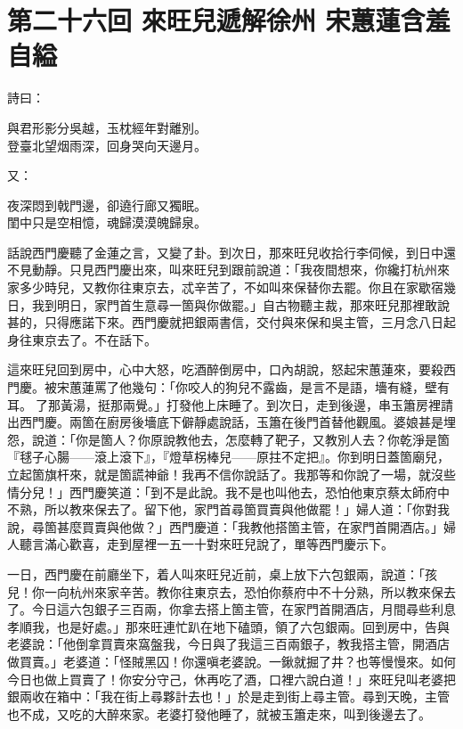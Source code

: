 
\chapter*{第二十六回 來旺兒遞解徐州 宋蕙蓮含羞自縊}


詩曰：

\begin{myquote}
與君形影分吳越，玉枕經年對離別。\\登臺北望烟雨深，回身哭向天邊月。
\end{myquote}

又：

\begin{myquote}
夜深悶到戟門邊，卻遶行廊又獨眠。\\閨中只是空相憶，魂歸漠漠魄歸泉。
\end{myquote}

話說西門慶聽了金蓮之言，又變了卦。到次日，那來旺兒收拾行李伺候，到日中還不見動靜。只見西門慶出來，叫來旺兒到跟前說道：「我夜間想來，你纔打杭州來家多少時兒，又教你往東京去，忒辛苦了，不如叫來保替你去罷。你且在家歇宿幾日，我到明日，家門首生意尋一箇與你做罷。」自古物聽主裁，那來旺兒那裡敢說甚的，只得應諾下來。西門慶就把銀兩書信，交付與來保和吳主管，三月念八日起身往東京去了。不在話下。

這來旺兒回到房中，心中大怒，{}吃酒醉倒房中，口內胡說，怒起宋蕙蓮來，要殺西門慶。{}被宋蕙蓮罵了他幾句：「你咬人的狗兒不露齒，是言不是語，墻有縫，壁有耳。𠳹了那黃湯，挺那兩覺。」打發他上床睡了。到次日，走到後邊，串玉簫房裡請出西門慶。兩箇在廚房後墻底下僻靜處說話，玉簫在後門首替他觀風。婆娘甚是埋怨，說道：「你是箇人？你原說教他去，怎麼轉了靶子，又教別人去？你乾淨是箇『毬子心腸——滾上滾下』，{}『燈草柺棒兒——原拄不定把』。你到明日蓋箇廟兒，立起箇旗杆來，就是箇謊神爺！我再不信你說話了。我那等和你說了一場，就沒些情分兒！」{}西門慶笑道：「到不是此說。我不是也叫他去，恐怕他東京蔡太師府中不熟，所以教來保去了。留下他，家門首尋箇買賣與他做罷！」婦人道：「你對我說，尋箇甚麼買賣與他做？」西門慶道：「我教他搭箇主管，在家門首開酒店。」婦人聽言滿心歡喜，走到屋裡一五一十對來旺兒說了，{}單等西門慶示下。

一日，西門慶在前廳坐下，着人叫來旺兒近前，桌上放下六包銀兩，說道：「孩兒！你一向杭州來家辛苦。教你往東京去，恐怕你蔡府中不十分熟，所以教來保去了。今日這六包銀子三百兩，你拿去搭上箇主管，在家門首開酒店，月間尋些利息孝順我，也是好處。」那來旺連忙趴在地下磕頭，領了六包銀兩。回到房中，告與老婆說：「他倒拿買賣來窩盤我，今日與了我這三百兩銀子，教我搭主管，開酒店做買賣。」老婆道：「怪賊黑囚！你還嗔老婆說。一鍬就掘了井？也等慢慢來。如何今日也做上買賣了！你安分守己，休再吃了酒，口裡六說白道！」來旺兒叫老婆把銀兩收在箱中：「我在街上尋夥計去也！」於是走到街上尋主管。尋到天晚，主管也不成，又吃的大醉來家。老婆打發他睡了，就被玉簫走來，叫到後邊去了。

